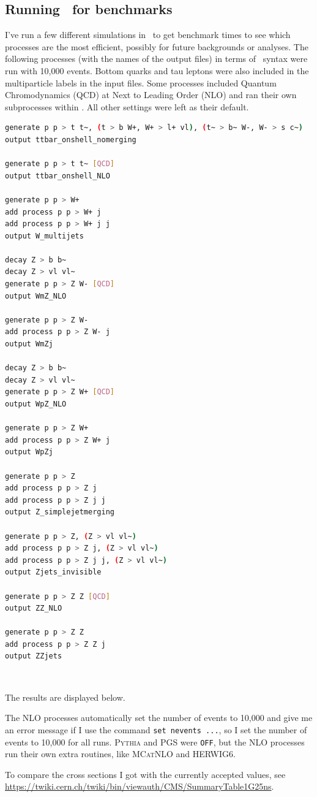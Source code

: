\subsection{Running \madgraph\ for benchmarks}

I've run a few different simulations in \madgraph\ to get benchmark times to see which processes are the most efficient, possibly for future backgrounds or analyses. The following processes (with the names of the output files) in terms of \madgraph\ syntax were run with 10,000 events. Bottom quarks and tau leptons were also included in the multiparticle labels in the input files. Some processes included Quantum Chromodynamics (QCD) at Next to Leading Order (NLO) and ran their own subprocesses within \madgraph. All other settings were left as their default.

\begin{lstlisting}[belowskip=-0.7cm, language=sh, numbers=none]
generate p p > t t~, (t > b W+, W+ > l+ vl), (t~ > b~ W-, W- > s c~)
output ttbar_onshell_nomerging

generate p p > t t~ [QCD]
output ttbar_onshell_NLO

generate p p > W+
add process p p > W+ j
add process p p > W+ j j
output W_multijets

decay Z > b b~
decay Z > vl vl~
generate p p > Z W- [QCD]
output WmZ_NLO

generate p p > Z W-
add process p p > Z W- j
output WmZj

decay Z > b b~
decay Z > vl vl~
generate p p > Z W+ [QCD]
output WpZ_NLO

generate p p > Z W+
add process p p > Z W+ j
output WpZj

generate p p > Z
add process p p > Z j
add process p p > Z j j
output Z_simplejetmerging

generate p p > Z, (Z > vl vl~)
add process p p > Z j, (Z > vl vl~)
add process p p > Z j j, (Z > vl vl~)
output Zjets_invisible

generate p p > Z Z [QCD]
output ZZ_NLO

generate p p > Z Z
add process p p > Z Z j
output ZZjets
\end{lstlisting}

\

The results are displayed below.



The NLO processes automatically set the number of events to 10,000 and give me an error message if I use the command \verb!set nevents ...!, so I set the number of events to 10,000 for all runs. \textsc{Pythia} and PGS were \verb!OFF!, but the NLO processes run their own extra routines, like \textsc{MCatNLO} and HERWIG6.

To compare the cross sections I got with the currently accepted values, see \url{https://twiki.cern.ch/twiki/bin/viewauth/CMS/SummaryTable1G25ns}.
